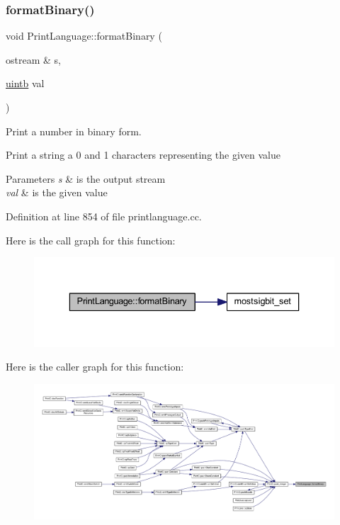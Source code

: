 \subsubsection{\texorpdfstring{formatBinary()}{formatBinary()}}
{\footnotesize\ttfamily void Print\+Language\+::format\+Binary (\begin{DoxyParamCaption}\item[{ostream \&}]{s,  }\item[{\mbox{\hyperlink{types_8h_a2db313c5d32a12b01d26ac9b3bca178f}{uintb}}}]{val }\end{DoxyParamCaption})\hspace{0.3cm}{\ttfamily [static]}}



Print a number in binary form. 

Print a string a \textquotesingle{}0\textquotesingle{} and \textquotesingle{}1\textquotesingle{} characters representing the given value 
\begin{DoxyParams}{Parameters}
{\em s} & is the output stream \\
\hline
{\em val} & is the given value \\
\hline
\end{DoxyParams}


Definition at line 854 of file printlanguage.\+cc.

Here is the call graph for this function\+:
\nopagebreak
\begin{figure}[H]
\begin{center}
\leavevmode
\includegraphics[width=336pt]{class_print_language_a32d76e94f94642915cfa67191de38a8a_cgraph}
\end{center}
\end{figure}
Here is the caller graph for this function\+:
\nopagebreak
\begin{figure}[H]
\begin{center}
\leavevmode
\includegraphics[width=350pt]{class_print_language_a32d76e94f94642915cfa67191de38a8a_icgraph}
\end{center}
\end{figure}
\mbox{\label{class_print_language_a56045dfbcc3c6739918ec60e248574c7}} 
